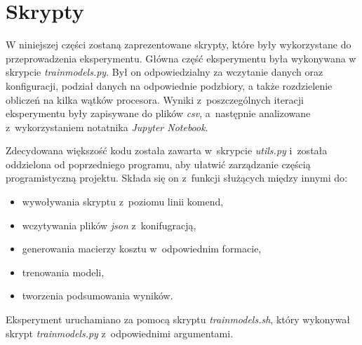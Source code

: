 \documentclass[inzynierska]{pwr_wmat_praca_dyplomowa}
\theoremstyle{plain}
\numberwithin{theorem}{chapter}
\theoremstyle{definition}
\numberwithin{theorem}{chapter}
\begin{document}
\chapter{Skrypty}
\label{scripts}
W niniejszej części zostaną zaprezentowane skrypty, które były wykorzystane do przeprowadzenia eksperymentu. Główna część eksperymentu była wykonywana w skrypcie \textit{trainmodels.py}. Był on odpowiedzialny za wczytanie danych oraz konfiguracji, podział danych na odpowiednie podzbiory, a także rozdzielenie obliczeń na kilka wątków procesora. Wyniki z~poszczególnych iteracji eksperymentu były zapisywane do plików \textit{csv}, a~następnie analizowane z~wykorzystaniem notatnika \textit{Jupyter Notebook}.


Zdecydowana większość kodu została zawarta w~skrypcie \textit{utils.py} i~została oddzielona od poprzedniego programu, aby ułatwić zarządzanie częścią programistyczną projektu. Składa się on z~funkcji służących między innymi do:
\begin{itemize}
	\item wywoływania skryptu z~poziomu linii komend,
	\item wczytywania plików \textit{json} z~konifugracją,
	\item generowania macierzy kosztu w~odpowiednim formacie,
	\item trenowania modeli,
	\item tworzenia podsumowania wyników.
\end{itemize}


Eksperyment uruchamiano za pomocą skryptu \textit{trainmodels.sh}, który wykonywał skrypt \textit{trainmodels.py} z~odpowiednimi argumentami.


\backmatter
\nocite{*}

\end{document}
